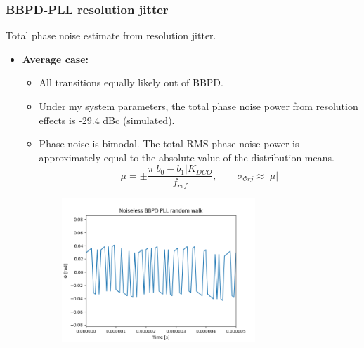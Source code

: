 \documentclass[t, screen, aspectratio=43]{beamer}
\begin{document}
\begin{frame}
	\frametitle{BBPD-PLL resolution jitter}
	\begin{block}{Total phase noise estimate from resolution jitter.}
			\tiny

			\begin{itemize}[itemsep=4pt,label=\protect---]

				\item \textbf{Average case:}
				\begin{itemize}[itemsep=4pt,label=\protect$\bullet$]
					\item All transitions equally likely out of BBPD.
					\item Under my system parameters, the total phase noise power from resolution effects is -29.4 dBc (simulated).
					\item Phase noise is bimodal. The total RMS phase noise power is approximately equal to the absolute value of the distribution means.
					\begin{equation}
						\mu = \pm\frac{\pi|b_0-b_1|K_{DCO}}{f_{ref}}, \hspace{2em}\sigma_{\Phi rj} \approx |\mu|
					\end{equation}
				\end{itemize}
			\end{itemize}
	\vspace{-3em}
	\begin{figure}[htb!]
	    \centering
	    \begin{subfigure}{0.5\textwidth}
	        \centering
	        \includegraphics[width=0.8\textwidth, angle=0]{bbpd_rw}
	    \end{subfigure}%
	    \begin{subfigure}{0.5\textwidth}

\end{subfigure}
\end{figure}
\end{block}
\end{frame}
\end{document}
